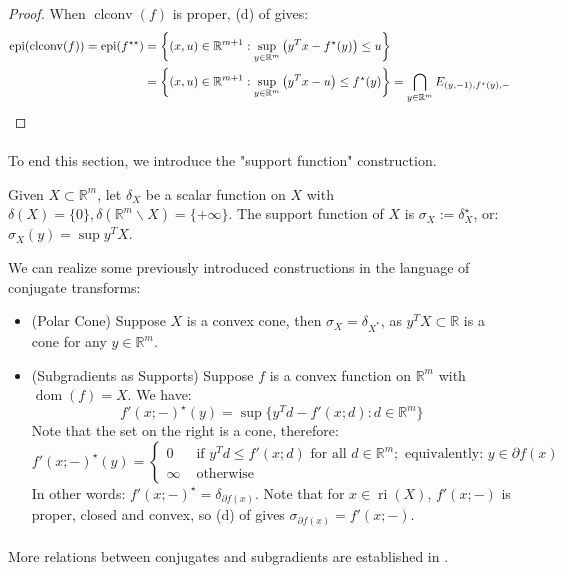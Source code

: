 \begin{proof}
	When $\operatorname{clconv}(f)$ is proper, (d) of  gives:
	\begin{align*}
		\operatorname{epi}(\operatorname{clconv}(f)) =\operatorname{epi}(f^{\star\star}) & =\left\{
		(x,u)\in \mathbb{R}^{m+1}:\sup_{y\in \mathbb{R}^m} \left(y^Tx-f^\star(y)\right)\leq u
		\right\}                                                                                    \\
		                                                                                 & =\left\{
		(x,u)\in \mathbb{R}^{m+1}:\sup_{y\in \mathbb{R}^m} \left(y^Tx-u\right)\leq f^\star(y)
		\right\}                                                                           =\bigcap_{y\in \mathbb{R}^m}E_{(y,-1),f^\star(y),-}\qedhere{}
	\end{align*}
\end{proof}

\paragraph{}To end this section, we introduce the "support function" construction.

\begin{defn}\label{defn:025-indicator-function}
	Given $X\subset \mathbb{R}^m$, let $\delta_X$ be a scalar function on $X$ with $\delta(X)=\{0\},\delta(\mathbb{R}^m\smallsetminus X)=\{+\infty\}$. The support function of $X$ is $\sigma_X:=\delta_X^{\star}$, or: $\sigma_X(y)=\sup y^TX$.
\end{defn}

\begin{exmp}We can realize some previously introduced constructions in the language of conjugate transforms:
	\begin{itemize}
		\item (Polar Cone) Suppose $X$ is a convex cone, then $\sigma_X=\delta_{X^\ast}$, as $y^TX\subset \mathbb{R}$ is a cone for any $y\in \mathbb{R}^m$.
		\item (Subgradients as Supports) Suppose $f$ is a convex function on $\mathbb{R}^m$ with $\operatorname{dom}(f)=X$. We have:
		      \[
			      f'(x;-)^\star(y) = \sup \{y^Td - f'(x; d):d\in \mathbb{R}^m\}
		      \]
		      Note that the set on the right is a cone, therefore:
		      \[
			      f'(x;-)^\star(y) = \begin{cases}
				      0      & \text{ if }y^Td \leq f'(x;d)\text{ for all }d\in \mathbb{R}^m;\text{ equivalently: }y\in\partial f(x) \\
				      \infty & \text{ otherwise}
			      \end{cases}
		      \]
		      In other words: $f'(x;-)^\star = \delta_{\partial f(x)}$. Note that for $x\in \operatorname{ri}(X)$, $f'(x;-)$ is proper, closed and convex, so (d) of  gives $\sigma_{\partial f(x)}=f'(x;-)$.
	\end{itemize}
\end{exmp}

\paragraph{}More relations between conjugates and subgradients are established in .

